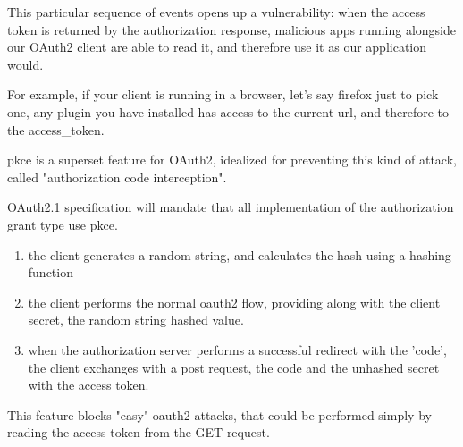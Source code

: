 This particular sequence of events opens up a vulnerability:
when the access token is returned by the authorization response, malicious apps
running alongside our OAuth2 client are able to read it, and therefore use it as
our application would.

For example, if your client is running in a browser, let's say firefox just to
pick one, any plugin you have installed has access to the current url, and
therefore to the access\_token.

\ac{pkce} is a superset feature for OAuth2, idealized for preventing this kind of
attack, called "authorization code interception".

OAuth2.1 specification will mandate that all implementation of the authorization
grant type use \ac{pkce}.

\begin{enumerate}
    \item the client generates a random string, and calculates the hash using a
        hashing function
    \item the client performs the normal oauth2 flow, providing along with the
        client secret, the random string hashed value.
    \item when the authorization server performs a successful redirect with the
        'code', the client exchanges with a post request, the code and the
        unhashed secret with the access token.
\end{enumerate}

This feature blocks "easy" oauth2 attacks, that could be performed simply by
reading the access token from the GET request.

